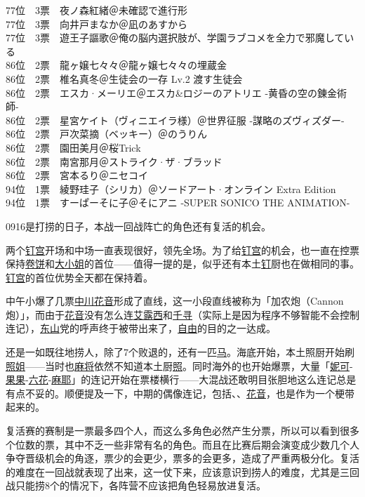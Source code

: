 {    77位　3票　夜ノ森紅緒＠未確認で進行形\\
    77位　3票　向井戸まなか＠凪のあすから\\
    77位　3票　遊王子謳歌＠俺の脳内選択肢が、学園ラブコメを全力で邪魔している\\
    86位　2票　龍ヶ嬢七々々＠龍ヶ嬢七々々の埋蔵金\\
    86位　2票　椎名真冬＠生徒会の一存 Lv.2 渡す生徒会\\
    86位　2票　エスカ·メーリエ＠エスカ\&ロジーのアトリエ -黄昏の空の錬金術師-\\
    86位　2票　星宮ケイト（ヴィニエイラ様）＠世界征服 -謀略のズヴィズダー-\\
    86位　2票　戸次菜摘（ベッキー）＠のうりん\\
    86位　2票　園田美月＠桜Trick\\
    86位　2票　南宮那月＠ストライク·ザ·ブラッド\\
    86位　2票　宮本るり＠ニセコイ\\
    94位　1票　綾野珪子（シリカ）＠ソードアート·オンライン Extra Edition\\
    94位　1票　すーぱーそに子＠そにアニ -SUPER SONICO THE ANIMATION-
}


0916是打捞的日子，本战一回战阵亡的角色还有复活的机会。

两个\uline{钉宫}开场和中场一直表现很好，领先全场。为了给\uline{钉宫}的机会，也一直在控票保持\uline{卷饼}和\uline{大小姐}的首位——值得一提的是，似乎还有本土\uline{钉}厨也在做相同的事。\uline{钉宫}的首位优势全天都在保持着。

中午小爆了几票\uline{中川花音}形成了直线，这一小段直线被称为「加农炮（Cannon炮）」，而由于\uline{花音}没有怎么连\uline{艾露西}和\uline{千寻}（实际上是因为程序不够智能不会控制连记），\uline{东山}党的呼声终于被带出来了，\uline{自由}的目的之一达成。

还是一如既往地捞人，除了7个败退的，还有一匹\uline{马}。海底开始，本土照厨开始刷\uline{照姐}——当时也\uline{麻将}依然不知道本土厨\uline{照}。同时海外的也开始爆票，大量「\uline{妮可}-\uline{果果}-\uline{六花}-\uline{麻耶}」的连记开始在票楼横行——大混战还敢明目张胆地这么连记总是有点不妥的。顺便提及一下，中期的偶像连记，包括、、\uline{花音}，也是作为一个梗带起来的。

复活赛的赛制是一票最多四个人，而这么多角色必然产生分票，所以可以看到很多个位数的票，其中不乏一些非常有名的角色。而且在比赛后期会演变成少数几个人争夺晋级机会的角逐，票少的会更少，票多的会更多，造成了严重两极分化。复活的难度在一回战就表现了出来，这一仗下来，应该意识到捞人的难度，尤其是三回战只能捞8个的情况下，各阵营不应该把角色轻易放进复活。

